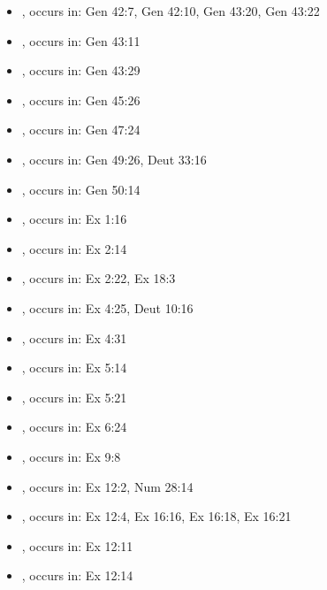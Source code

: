 \documentclass[14pt]{article}
\begin{document}
\begin{itemize}
\item {}, occurs in: Gen 42:7, Gen 42:10, Gen 43:20, Gen 43:22

\item {}, occurs in: Gen 43:11

\item {}, occurs in: Gen 43:29

\item {}, occurs in: Gen 45:26

\item {}, occurs in: Gen 47:24

\item {}, occurs in: Gen 49:26, Deut 33:16

\item {}, occurs in: Gen 50:14

\item {}, occurs in: Ex 1:16

\item {}, occurs in: Ex 2:14

\item {}, occurs in: Ex 2:22, Ex 18:3

\item {}, occurs in: Ex 4:25, Deut 10:16

\item {}, occurs in: Ex 4:31

\item {}, occurs in: Ex 5:14

\item {}, occurs in: Ex 5:21

\item {}, occurs in: Ex 6:24

\item {}, occurs in: Ex 9:8

\item {}, occurs in: Ex 12:2, Num 28:14

\item {}, occurs in: Ex 12:4, Ex 16:16, Ex 16:18, Ex 16:21

\item {}, occurs in: Ex 12:11

\item {}, occurs in: Ex 12:14


\end{itemize}
\end{document}
